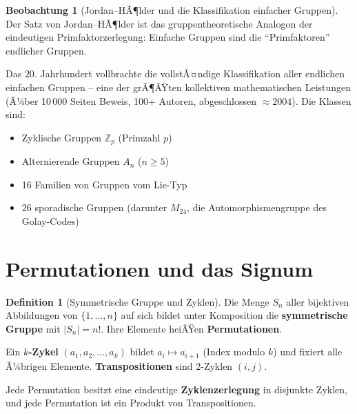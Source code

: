 ﻿\documentclass[a4paper,12pt]{report}
\theoremstyle{definition}
\newtheorem{definition}{Definition}
\newtheorem{beobachtung}{Beobachtung}
\begin{document}
\begin{beobachtung}[Jordan--HÃ¶lder und die Klassifikation einfacher Gruppen]
    Der Satz von Jordan--HÃ¶lder ist das gruppentheoretische Analogon
    der eindeutigen Primfaktorzerlegung: Einfache Gruppen sind die
    ``Primfaktoren'' endlicher Gruppen.

    Das $20.$ Jahrhundert vollbrachte die vollstÃ¤ndige Klassifikation
    aller endlichen einfachen Gruppen -- eine der grÃ¶ÃŸten kollektiven
    mathematischen Leistungen (Ã¼ber 10\,000 Seiten Beweis, 100+ Autoren,
    abgeschlossen $\approx 2004$). Die Klassen sind:
    \begin{itemize}
        \item[-] Zyklische Gruppen $\mathbb{Z}_p$ (Primzahl $p$)
        \item[-] Alternierende Gruppen $A_n$ ($n \geq 5$)
        \item[-] 16 Familien von Gruppen vom Lie-Typ
        \item[-] 26 sporadische Gruppen (darunter $M_{24}$, die Automorphismengruppe
              des Golay-Codes)
    \end{itemize}
\end{beobachtung}

\section{Permutationen und das Signum}

\begin{definition}[Symmetrische Gruppe und Zyklen]
    Die Menge $S_n$ aller bijektiven Abbildungen von $\{1, \dots, n\}$
    auf sich bildet unter Komposition die \textbf{symmetrische Gruppe}
    mit $|S_n| = n!$. Ihre Elemente heiÃŸen \textbf{Permutationen}.

    Ein \textbf{$k$-Zykel} $(a_1, a_2, \dots, a_k)$ bildet $a_i \mapsto a_{i+1}$
    (Index modulo $k$) und fixiert alle Ã¼brigen Elemente.
    \textbf{Transpositionen} sind 2-Zyklen $(i,j)$.

    Jede Permutation besitzt eine eindeutige \textbf{Zyklenzerlegung}
    in disjunkte Zyklen, und jede Permutation ist ein Produkt von
    Transpositionen.
\end{definition}
\end{document}
